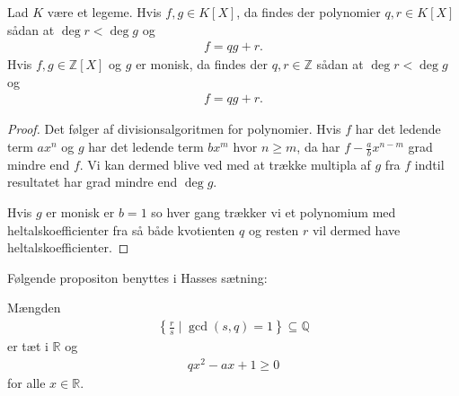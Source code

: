 \begin{thm}
\label{monic}
Lad $K$ være et legeme. Hvis $f, g \in K[X]$, da findes der polynomier $q, r \in K[X]$ sådan at $\deg r < \deg g$ og
\begin{align*}
	f = qg + r.
\end{align*}
Hvis $f, g \in \mathbb{Z}[X]$ og $g$ er monisk, da findes der $q, r \in \mathbb{Z}$ sådan at $\deg r < \deg g$ og
\begin{align*}
	f = qg + r.
\end{align*}
\end{thm}
\begin{proof}
Det følger af divisionsalgoritmen for polynomier. Hvis $f$ har det ledende term $ax^n$ og $g$ har det ledende term $bx^m$ hvor $n \geq m$, da har $f - \frac{a}{b} x^{n-m}$ grad mindre end $f$. Vi kan dermed blive ved med at trække multipla af $g$ fra $f$ indtil resultatet har grad mindre end $\deg g$.

Hvis $g$ er monisk er $b=1$ so hver gang trækker vi et polynomium med heltalskoefficienter fra så både kvotienten $q$ og resten $r$ vil dermed have heltalskoefficienter.
\end{proof}
\label{appendiks_andre}
Følgende propositon benyttes i Hasses sætning: 
\begin{proposition}
\label{appendiks_dense}
Mængden 
\begin{align*}
	\left\{ \frac{r}{s} \mid \gcd(s, q) = 1 \right\} \subseteq \mathbb{Q}
\end{align*}
er tæt i $\mathbb{R}$ og 
\begin{align*}
	qx^2 - ax +1 \geq 0
\end{align*}
for alle $x \in \mathbb{R}$.
\end{proposition}
